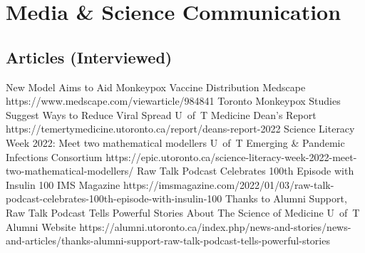 \clearpage %
\section{Media \& Science Communication}\onedate
\subsection{Articles (Interviewed)}
  {New Model Aims to Aid Monkeypox Vaccine Distribution}
  {Medscape}
  {https://www.medscape.com/viewarticle/984841}{}
  {Toronto Monkeypox Studies Suggest Ways to Reduce Viral Spread}
  {U~of~T Medicine Dean's Report}
  {https://temertymedicine.utoronto.ca/report/deans-report-2022}{}
  {Science Literacy Week 2022: Meet two mathematical modellers}
  {U~of~T Emerging \& Pandemic Infections Consortium}
  {https://epic.utoronto.ca/science-literacy-week-2022-meet-two-mathematical-modellers/}{}
  {Raw Talk Podcast Celebrates 100th Episode with Insulin 100}
  {IMS Magazine}
  {https://imsmagazine.com/2022/01/03/raw-talk-podcast-celebrates-100th-episode-with-insulin-100}{}
  {Thanks to Alumni Support, Raw Talk Podcast Tells Powerful Stories About The Science of Medicine}
  {U~of~T Alumni Website}
  {https://alumni.utoronto.ca/index.php/news-and-stories/news-and-articles/thanks-alumni-support-raw-talk-podcast-tells-powerful-stories}{}
